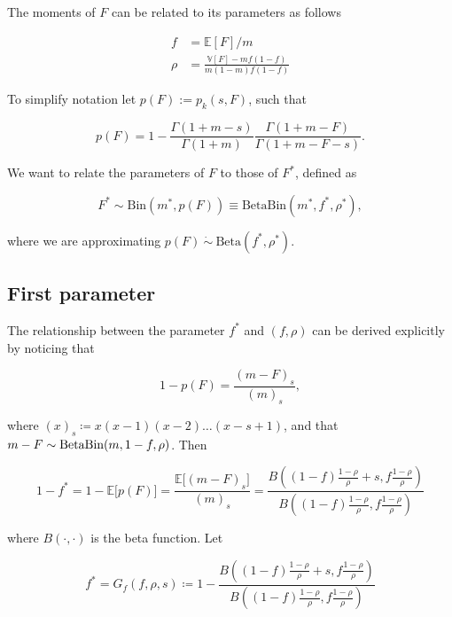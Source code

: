 \documentclass[american, abstract=on]{scrartcl}
\newcommand{\E}{\mathbb{E}}
\newcommand{\V}{\mathbb{V}}
\begin{document}
The moments of $F$ can be related to its parameters as follows

\begin{equation}
  \begin{split}
    f &= \E\left[F\right] / m \\
    \rho &= \frac{\V[F] - m f (1 - f)}{m (1 - m) f (1 - f)}
  \end{split}
\end{equation}

To simplify notation let $p(F) := p_k(s, F)$, such that

\begin{equation}
  p(F) = 1 - \frac{\Gamma(1 + m - s)}{\Gamma(1 + m)}\frac{\Gamma(1 + m - F)}{\Gamma(1 + m - F - s)}.
\end{equation}

We want to relate the parameters of $F$ to those of $F^*$, defined as

\begin{equation}
  F^* \sim \text{Bin}(m^*, p(F)) \equiv \text{BetaBin}(m^*, f^*, \rho^*),
\end{equation}

where we are approximating $p(F) \ \dot{\sim} \ \text{Beta}(f^*, \rho^*)$.

\subsection{First parameter}

The relationship between the parameter $f^*$ and $(f, \rho)$ can be derived explicitly by noticing that 

\begin{equation}
  1 - p(F) = \frac{(m - F)_s}{(m)_s},
\end{equation}

where $(x)_s \coloneqq x (x - 1)(x-2)\ldots (x - s + 1)$, and that $m - F \sim \text{Beta}\text{Bin}(m, 1 - f, \rho)$. Then 

\begin{equation}
  1 - f^* = 1 - \E\big[p(F)\big] =  \frac{\E\big[(m - F)_s\big]}{(m)_s} = \frac{B\left((1 - f) \frac{1 - \rho}{\rho} + s, f \frac{1 - \rho}{\rho} \right)}{B\left((1 - f) \frac{1 - \rho}{\rho} , f \frac{1 - \rho}{\rho} \right)}
\end{equation}

where $B(\cdot, \cdot)$ is the beta function. Let

\begin{equation}
  f^* = G_f(f, \rho, s) \coloneqq 1 - \frac{B\left((1 - f) \frac{1 - \rho}{\rho} + s, f \frac{1 - \rho}{\rho} \right)}{B\left((1 - f) \frac{1 - \rho}{\rho} , f \frac{1 - \rho}{\rho} \right)}
\end{equation}
 
\end{document}
